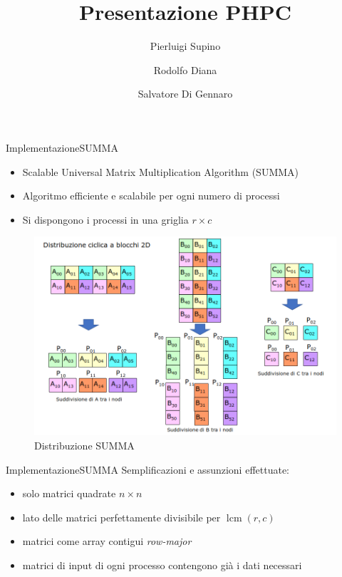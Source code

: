 \documentclass{beamer}
\title{Presentazione PHPC}
\author{Pierluigi Supino \and Rodolfo Diana \and Salvatore Di Gennaro}
\DeclareMathOperator{\lcm}{lcm}
\begin{document}
\begin{frame}
    \titlepage
\end{frame}

\begin{frame}{Implementazione}{SUMMA}
    \begin{itemize}
        \item Scalable Universal Matrix Multiplication Algorithm (SUMMA)
        \item Algoritmo efficiente e scalabile per ogni numero di processi
        \item Si dispongono i processi in una griglia $r \times c$
    \end{itemize}
    \begin{figure}
        \includegraphics[width=0.5\linewidth]{imgs/summa.png}
        \caption{Distribuzione SUMMA}
    \end{figure}
\end{frame}

\begin{frame}{Implementazione}{SUMMA}
    Semplificazioni e assunzioni effettuate:
    \begin{itemize}
        \item solo matrici quadrate $n \times n$
        \item lato delle matrici perfettamente divisibile per $\lcm(r,c)$
        \item matrici come array contigui \textit{row-major}
        \item matrici di input di ogni processo contengono già i dati necessari
    \end{itemize}
\end{frame}
\end{document}
